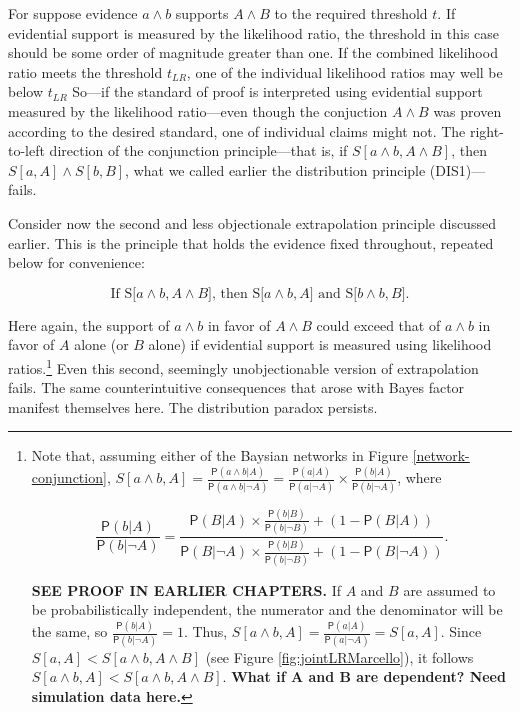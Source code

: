 \documentclass[10pt,dvipsnames,enabledeprecatedfontcommands]{scrartcl}
\newcommand{\et}{\wedge}
\newcommand{\pr}[1]{\mathsf{P}(#1)}
\begin{document}
For suppose evidence \(a \et b\) supports \(A \et B\) to the required
threshold \(t\). If evidential support is measured by the likelihood
ratio, the threshold in this case should be some order of magnitude
greater than one. If the combined likelihood ratio meets the threshold
\(t_{LR}\), one of the individual likelihood ratios may well be below
\(t_{LR}\) So---if the standard of proof is interpreted using evidential
support measured by the likelihood ratio---even though the conjuction
\(A \et B\) was proven according to the desired standard, one of
individual claims might not. The right-to-left direction of the
conjunction principle---that is, if \(S[a \et b, A \et B]\), then
\(S[a, A] \et S[b, B]\), what we called earlier the distribution
principle (DIS1)---fails.

Consider now the second and less objectionale extrapolation principle
discussed earlier. This is the principle that holds the evidence fixed
throughout, repeated below for convenience:

\[\text{If S[$a \wedge b, A\wedge B$], then S[$a \wedge b, A$] and S[$b \wedge b, B$].} \tag{DIS2}\]

\noindent Here again, the support of \(a\wedge b\) in favor of
\(A\wedge B\) could exceed that of \(a\wedge b\) in favor of \(A\) alone
(or \(B\) alone) if evidential support is measured using likelihood
ratios.\footnote{Note that, assuming either of the Baysian networks 
in Figure \ref{network-conjunction},  $S[a\wedge b, A]=\frac{\pr{a \wedge b \vert A}}{\pr{a\wedge b\vert \neg A}}=\frac{\pr{a \vert A}}{\pr{a \vert \neg A}}\times \frac{\pr{b \vert A}}{\pr{b \vert \neg A}}$, where

\[\frac{\pr{b \vert A}}{\pr{b \vert \neg A}} = \frac{\pr{B \vert A} \times \frac{\pr{b \vert B}}{\pr{b \vert \neg B}} + (1- \pr{B \vert A})}{\pr{B \vert \neg A} \times \frac{\pr{b \vert B}}{\pr{b \vert \neg B}} + (1- \pr{B \vert \neg A})}.\]

\textbf{SEE PROOF IN EARLIER CHAPTERS.}
 If $A$ and $B$ are assumed to be probabilistically independent, the numerator and the denominator will be the same, 
 so $\frac{\pr{b \vert A}}{\pr{b \vert \neg A}}=1$. Thus, 
 $S[a\wedge b, A]=\frac{\pr{a \vert A}}{\pr{a \vert \neg A}}=S[a, A]$. Since $S[a, A]< S[a\wedge b, A\wedge B]$ (see Figure \ref{fig:jointLRMarcello}), it follows $S[a\wedge b, A]<S[a\wedge b, A\wedge B]$. \textbf{What if A and B are dependent? Need simulation data here.}}
Even this second, seemingly unobjectionable version of extrapolation
fails. The same counterintuitive consequences that arose with Bayes
factor manifest themselves here. The distribution paradox persists.
\end{document}
